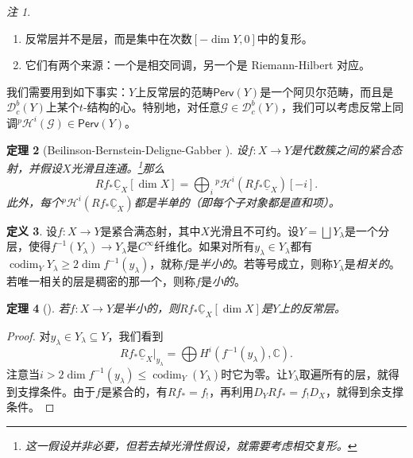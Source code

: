 \documentclass{amsart}
\newtheorem{thm}{定理}[section]
\theoremstyle{definition}
\newtheorem{defn}[thm]{定义}
\theoremstyle{remark}
\newtheorem{rmks}[thm]{注}
\theoremstyle{plain}
\theoremstyle{definition}
\theoremstyle{remark}
\newcommand{\C}{\mathbb{C}}
\newcommand{\mc}[1]{\mathcal{#1}}
\newcommand{\on}[1]{\operatorname{#1}}
\newcommand{\ms}[1]{\mathsf{#1}}
\newcommand{\ul}[1]{\underline{#1}}
\newcommand{\1}{\mathbf{1}}
\newcommand{\2}{\mathbf{2}}
\newcommand{\3}{\mathbf{3}}
\begin{document}
\begin{rmks}\leavevmode
    \begin{enumerate}
        \item 反常层并不是层，而是集中在次数\([-\dim Y, 0]\)中的复形。
        \item 它们有两个来源：一个是相交同调，另一个是 Riemann-Hilbert 对应。
    \end{enumerate}
\end{rmks}

我们需要用到如下事实：\(Y\)上反常层的范畴\(\ms{Perv}(Y)\)是一个阿贝尔范畴，而且是\(\mc{D}_c^b(Y)\)上某个\(t\)-结构的心。特别地，对任意\(\mc{G} \in \mc{D}_c^b (Y)\)，我们可以考虑反常上同调\(^p\mc{H}^i(\mc{G}) \in \ms{Perv}(Y)\)。

\begin{thm}[Beilinson-Bernstein-Deligne-Gabber {\cite{BBD1982}}]
    设\(f \colon X \to Y\)是代数簇之间的紧合态射，并假设\(X\)光滑且连通。\footnote{这一假设并非必要，但若去掉光滑性假设，就需要考虑相交复形。}那么
    \[ R f_* \ul{\C}_X [\dim X] = \bigoplus_{i} {^p\mc{H}^i}(R f_* \ul{\C}_X)[-i]. \]
    此外，每个\(^p\mc{H}^i (R f_* \ul{\C}_X)\)都是半单的（即每个子对象都是直和项）。
\end{thm}

\begin{defn}
    设\(f \colon X \to Y\)是紧合满态射，其中\(X\)光滑且不可约。设\(Y = \bigsqcup Y_{\lambda}\)是一个分层，使得\(f^{-1}(Y_{\lambda}) \to Y_{\lambda}\)是\(C^{\infty}\)纤维化。如果对所有\(y_{\lambda} \in Y_{\lambda}\)都有\(\on{codim}_Y Y_{\lambda} \geq 2 \dim f^{-1} (y_{\lambda})\)，就称\(f\)是\textit{半小的}。若等号成立，则称\(Y_{\lambda}\)是\textit{相关的}。若唯一相关的层是稠密的那一个，则称\(f\)是\textit{小的}。
\end{defn}

\begin{thm}[{\cite{DeCataldoMigliorini2002}}]
    若\(f \colon X \to Y\)是半小的，则\(R f_* \ul{\C}_X [\dim X]\)是\(Y\)上的反常层。
\end{thm}

\begin{proof}
    对\(y_{\lambda} \in Y_{\lambda} \subseteq Y\)，我们看到
    \[ R f_* \ul{\C}_X |_{y_{\lambda}} = \bigoplus H^i (f^{-1}(y_{\lambda}), \C). \]
    注意当\(i > 2 \dim f^{-1}(y_{\lambda}) \leq \on{codim}_Y (Y_{\lambda})\)时它为零。让\(Y_{\lambda}\)取遍所有的层，就得到支撑条件。由于\(f\)是紧合的，有\(R f_* = f_!\)，再利用\(D_Y R f_* = f_! D_X\)，就得到余支撑条件。
\end{proof}
\end{document}
